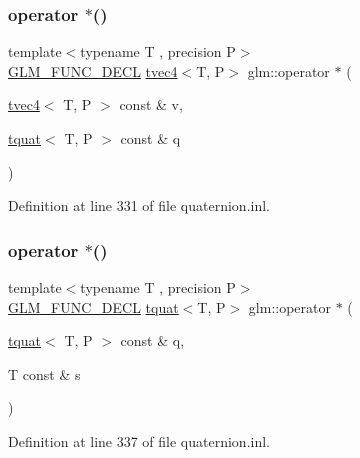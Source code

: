 \subsubsection{\texorpdfstring{operator $\ast$()}{operator *()}\hspace{0.1cm}{\footnotesize\ttfamily [5/7]}}
{\footnotesize\ttfamily template$<$typename T , precision P$>$ \\
\mbox{\hyperlink{setup_8hpp_ab2d052de21a70539923e9bcbf6e83a51}{G\+L\+M\+\_\+\+F\+U\+N\+C\+\_\+\+D\+E\+CL}} \mbox{\hyperlink{structglm_1_1tvec4}{tvec4}}$<$T, P$>$ glm\+::operator $\ast$ (\begin{DoxyParamCaption}\item[{\mbox{\hyperlink{structglm_1_1tvec4}{tvec4}}$<$ T, P $>$ const \&}]{v,  }\item[{\mbox{\hyperlink{structglm_1_1tquat}{tquat}}$<$ T, P $>$ const \&}]{q }\end{DoxyParamCaption})}



Definition at line 331 of file quaternion.\+inl.

\mbox{\label{group__gtc__quaternion_ga1e92069464e09ce81a9a27d67b9ef440}} 
\subsubsection{\texorpdfstring{operator $\ast$()}{operator *()}\hspace{0.1cm}{\footnotesize\ttfamily [6/7]}}
{\footnotesize\ttfamily template$<$typename T , precision P$>$ \\
\mbox{\hyperlink{setup_8hpp_ab2d052de21a70539923e9bcbf6e83a51}{G\+L\+M\+\_\+\+F\+U\+N\+C\+\_\+\+D\+E\+CL}} \mbox{\hyperlink{structglm_1_1tquat}{tquat}}$<$T, P$>$ glm\+::operator $\ast$ (\begin{DoxyParamCaption}\item[{\mbox{\hyperlink{structglm_1_1tquat}{tquat}}$<$ T, P $>$ const \&}]{q,  }\item[{T const \&}]{s }\end{DoxyParamCaption})}



Definition at line 337 of file quaternion.\+inl.

\mbox{\label{group__gtc__quaternion_ga75ae9786475c53c29b719174cb5c38f4}} 
